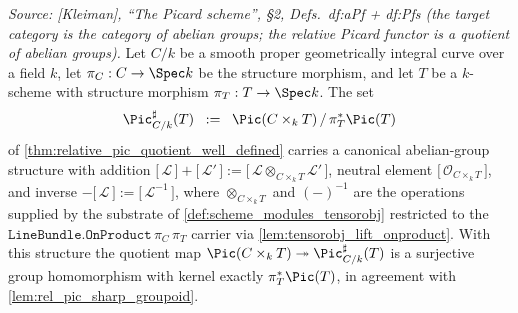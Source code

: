 \begin{theorem}
  \textit{Source: [Kleiman], ``The Picard scheme'', \S 2,
  Defs.~df:aPf + df:Pfs (the target category is the category of abelian
  groups; the relative Picard functor is a quotient of abelian groups).}
  Let \(C/k\) be a smooth proper geometrically integral curve over a
  field \(k\), let \(\pi_C : C \to \Spec k\) be the structure morphism,
  and let \(T\) be a \(k\)-scheme with structure morphism
  \(\pi_T : T \to \Spec k\). The set
  \[
    \Pic^{\sharp}_{C/k}(T) \;\;:=\;\; \Pic(C \times_k T) \,/\, \pi_T^*\Pic(T)
  \]
  of \cref{thm:relative_pic_quotient_well_defined} carries a canonical
  abelian-group structure with addition
  \(\bigl[\,\mathcal{L}\,\bigr] + \bigl[\,\mathcal{L}'\,\bigr]
   := \bigl[\,\mathcal{L} \otimes_{C \times_k T} \mathcal{L}'\,\bigr]\),
  neutral element \(\bigl[\,\mathcal{O}_{C \times_k T}\,\bigr]\), and
  inverse
  \(-\bigl[\,\mathcal{L}\,\bigr] := \bigl[\,\mathcal{L}^{-1}\,\bigr]\),
  where \(\otimes_{C \times_k T}\) and \((-)^{-1}\) are the operations
  supplied by the substrate of \cref{def:scheme_modules_tensorobj}
  restricted to the \(\texttt{LineBundle.OnProduct}\,\pi_C\,\pi_T\) carrier
  via \cref{lem:tensorobj_lift_onproduct}. With this structure the quotient
  map
  \(\Pic(C \times_k T) \twoheadrightarrow \Pic^{\sharp}_{C/k}(T)\) is a
  surjective group homomorphism with kernel exactly \(\pi_T^*\Pic(T)\),
  in agreement with \cref{lem:rel_pic_sharp_groupoid}.
\end{theorem}

